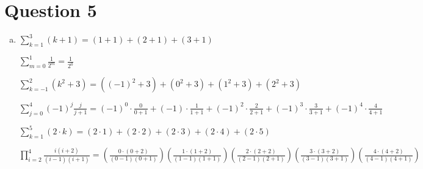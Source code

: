 \documentclass[12pt]{article}
\begin{document}
\section*{Question 5}
\begin{enumerate}[a.]

    \item

    $\sum\limits_{k=1}^3 (k+1) = (1 + 1) + (2 + 1) + (3 + 1)$

    $\sum\limits_{m=0}^1 \frac{1}{2^m} = \frac{1}{2^0}$

    $\sum\limits_{k=-1}^2 (k^2 + 3) = ((-1)^2 + 3) + (0^2 + 3) + (1^2 + 3) + (2^2 + 3)$

    $\sum\limits_{j=0}^4 (-1)^j \frac{j}{j + 1} = (-1)^0 \cdot \frac{0}{0 + 1} +
    (-1) \cdot \frac{1}{1 + 1} + (-1)^2 \cdot \frac{2}{2 + 1} + (-1)^3 \cdot \frac{3}{3 + 1} +
    (-1)^4 \cdot \frac{4}{4 + 1}$

    $\sum\limits_{k=1}^5 (2 \cdot k) = (2 \cdot 1) + (2 \cdot 2) + (2 \cdot 3) +
    (2 \cdot 4) + (2 \cdot 5)$

    $\prod\limits_{i=2}^4 \frac{i(i+2)}{(i-1)(i+1)} = \left( \frac{0 \cdot (0+2)}{(0-1)(0+1)} \right)
    \left( \frac{1 \cdot (1+2)}{(1-1)(1+1)} \right) \left( \frac{2 \cdot (2+2)}{(2-1)(2+1)} \right)
    \left( \frac{3 \cdot (3+2)}{(3-1)(3+1)} \right) \left( \frac{4 \cdot (4+2)}{(4-1)(4+1)} \right)$

\end{enumerate}
\end{document}
